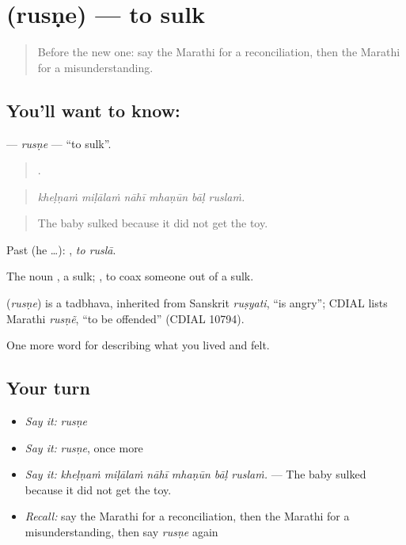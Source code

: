 \section[\texorpdfstring{\mr{रुसणे} (rusṇe)}{रुसणे (rusṇe)}]{ (rusṇe) — to sulk}

\label{lesson:MR-C454-rusne}



\begin{quote}
Before the new one: say the Marathi for a reconciliation, then the Marathi for a misunderstanding.
\end{quote}

\subsection*{You'll want to know: }
\textbf{} — \emph{rusṇe} — \textquotedblleft{}to sulk\textquotedblright{}.

\begin{quote}
     .
\end{quote}

\begin{quote}
\emph{kheḷṇaṁ miḷālaṁ nāhī mhaṇūn bāḷ ruslaṁ.}
\end{quote}

\begin{quote}
The baby sulked because it did not get the toy.
\end{quote}

Past (he …):  , \emph{to ruslā}.

The noun , a sulk;  , to coax someone out of a sulk.

\begin{cousinweb}
\textbf{} (\emph{rusṇe}) is a tadbhava, inherited from Sanskrit \emph{ruṣyati}, \textquotedblleft{}is angry\textquotedblright{}; CDIAL lists Marathi \emph{rusṇẽ}, \textquotedblleft{}to be offended\textquotedblright{} (CDIAL 10794).
\end{cousinweb}

\begin{grammarlens}[title={What you've built}]
One more word for describing what you lived and felt.
\end{grammarlens}

\subsection*{Your turn}
\begin{itemize}
\raggedright
  \item \emph{Say it:} \emph{rusṇe}
  \item \emph{Say it:} \emph{rusṇe}, once more
  \item \emph{Say it:} \emph{kheḷṇaṁ miḷālaṁ nāhī mhaṇūn bāḷ ruslaṁ.} — The baby sulked because it did not get the toy.
  \item \emph{Recall:} say the Marathi for a reconciliation, then the Marathi for a misunderstanding, then say \emph{rusṇe} again
\end{itemize}


